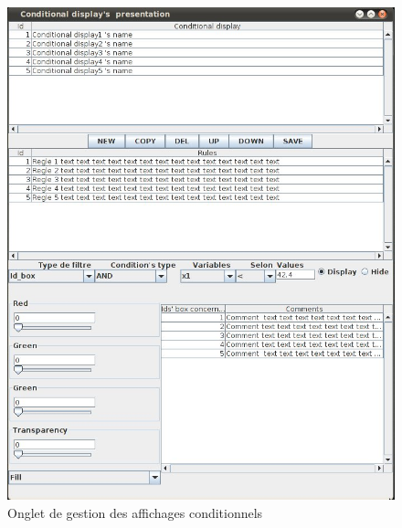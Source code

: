 \documentclass[a4paper]{article}
\begin{document}
\begin{figure}[!h] %
  \center
  \includegraphics[scale=0.40]{spec-images/Aff_cond.jpeg} %
  \caption{Onglet de gestion des affichages conditionnels} %
\end{figure} %
\end{document}
